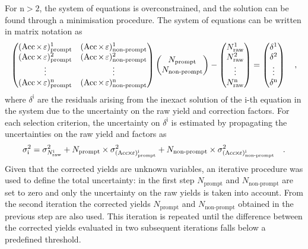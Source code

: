 For $\mathrm{n>2}$, the system of equations is overconstrained, and the solution can be found through a minimisation procedure. The system of equations can be written in matrix notation as
\begin{equation*}
    \begin{pmatrix}
        (\mathrm{Acc}\mkern-2mu\times\mkern-2mu\varepsilon)_\mathrm{prompt}^1 & (\mathrm{Acc}\mkern-2mu\times\mkern-2mu\varepsilon)_\mathrm{non\text{-}prompt}^1\\
        (\mathrm{Acc}\mkern-2mu\times\mkern-2mu\varepsilon)_\mathrm{prompt}^2 & (\mathrm{Acc}\mkern-2mu\times\mkern-2mu\varepsilon)_\mathrm{non\text{-}prompt}^2\\
        \vdots & \vdots\\
        (\mathrm{Acc}\mkern-2mu\times\mkern-2mu\varepsilon)_\mathrm{prompt}^\mathrm{n} & (\mathrm{Acc}\mkern-2mu\times\mkern-2mu\varepsilon)_\mathrm{non\text{-}prompt}^\mathrm{n}
    \end{pmatrix}
    \begin{pmatrix}
        N_\mathrm{prompt}\\
        N_\mathrm{non\text{-}prompt}
    \end{pmatrix}
    -
    \begin{pmatrix}
        N_\mathrm{raw}^1\\
        N_\mathrm{raw}^2\\
        \vdots\\
        N_\mathrm{raw}^\mathrm{n}
    \end{pmatrix}
    =
    \begin{pmatrix}
        \delta^1\\
        \delta^2\\
        \vdots\\
        \delta^\mathrm{n}
    \end{pmatrix}
    \quad ,
\end{equation*}
where $\delta^\mathrm{i}$ are the residuals arising from the inexact solution of the i-th equation in the system due to the uncertainty on the raw yield and \aeff correction factors. For each selection criterion, the uncertainty on $\delta^\mathrm{i}$ is estimated by propagating the uncertainties on the raw yield and \aeff factors as
\begin{equation*}
    \sigma_\mathrm{i}^2 = \sigma_{N_\mathrm{raw}^\mathrm{i}}^2 + N_\mathrm{prompt}\times\sigma^2_{(\mathrm{Acc}\mkern-2mu\times\mkern-2mu\varepsilon)_\mathrm{prompt}^\mathrm{i}} + N_\mathrm{non\text{-}prompt}\times\sigma^2_{(\mathrm{Acc}\mkern-2mu\times\mkern-2mu\varepsilon)_\mathrm{non\text{-}prompt}^\mathrm{i}}\quad .
\end{equation*}
Given that the corrected yields are unknown variables, an iterative procedure was used to define the total uncertainty: in the first step 
$N_{\mathrm{prompt}}$ and $N_{\mathrm{non\text{-}prompt}}$ are set to zero and only the uncertainty on the raw yields is taken into account. From the second iteration the corrected yields $N_{\mathrm{prompt}}$ and $N_{\mathrm{non\text{-}prompt}}$ obtained in the previous step are also used. This iteration is repeated until the difference between the corrected yields evaluated in two subsequent iterations falls below a predefined threshold.

